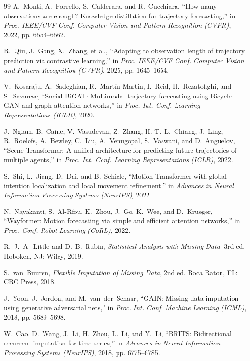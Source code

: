 \begin{thebibliography}{99}
A.~Monti, A.~Porrello, S.~Calderara, and R.~Cucchiara, ``How many observations are enough? Knowledge distillation for trajectory forecasting,'' in \emph{Proc. IEEE/CVF Conf. Computer Vision and Pattern Recognition (CVPR)}, 2022, pp. 6553--6562.

R.~Qiu, J.~Gong, X.~Zhang, et al., ``Adapting to observation length of trajectory prediction via contrastive learning,'' in \emph{Proc. IEEE/CVF Conf. Computer Vision and Pattern Recognition (CVPR)}, 2025, pp. 1645--1654.

V.~Kosaraju, A.~Sadeghian, R.~Mart\'in-Mart\'in, I.~Reid, H.~Rezatofighi, and S.~Savarese, ``Social-BiGAT: Multimodal trajectory forecasting using Bicycle-GAN and graph attention networks,'' in \emph{Proc. Int. Conf. Learning Representations (ICLR)}, 2020.

J.~Ngiam, B.~Caine, V.~Vasudevan, Z.~Zhang, H.-T.~L.~Chiang, J.~Ling, R.~Roelofs, A.~Bewley, C.~Liu, A.~Venugopal, S.~Vaswani, and D.~Anguelov, ``Scene Transformer: A unified architecture for predicting future trajectories of multiple agents,'' in \emph{Proc. Int. Conf. Learning Representations (ICLR)}, 2022.

S.~Shi, L.~Jiang, D.~Dai, and B.~Schiele, ``Motion Transformer with global intention localization and local movement refinement,'' in \emph{Advances in Neural Information Processing Systems (NeurIPS)}, 2022.

N.~Nayakanti, S.~Al-Rfou, K.~Zhou, J.~Go, K.~Wee, and D.~Krueger, ``Wayformer: Motion forecasting via simple and efficient attention networks,'' in \emph{Proc. Conf. Robot Learning (CoRL)}, 2022.

R.~J.~A.~Little and D.~B.~Rubin, \emph{Statistical Analysis with Missing Data}, 3rd ed. Hoboken, NJ: Wiley, 2019.

S.~van~Buuren, \emph{Flexible Imputation of Missing Data}, 2nd ed. Boca Raton, FL: CRC Press, 2018.

J.~Yoon, J.~Jordon, and M.~van~der~Schaar, ``GAIN: Missing data imputation using generative adversarial nets,'' in \emph{Proc. Int. Conf. Machine Learning (ICML)}, 2018, pp. 5689--5698.

W.~Cao, D.~Wang, J.~Li, H.~Zhou, L.~Li, and Y.~Li, ``BRITS: Bidirectional recurrent imputation for time series,'' in \emph{Advances in Neural Information Processing Systems (NeurIPS)}, 2018, pp. 6775--6785.


\end{thebibliography}
